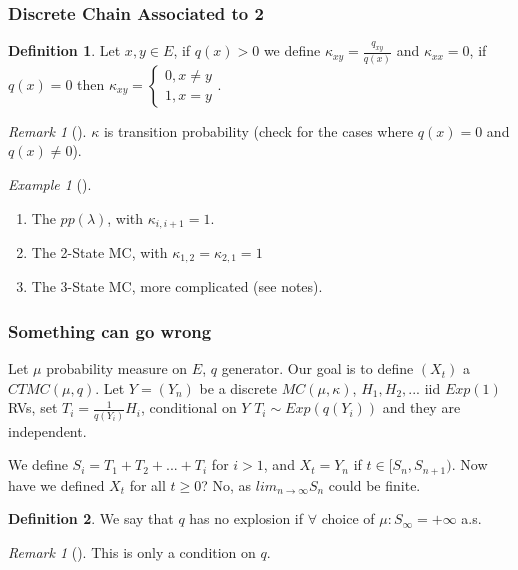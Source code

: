 \documentclass[12pt]{book}
\theoremstyle{definition}
\newtheorem{defn}{Definition}[section]
\theoremstyle{remark}
\newtheorem{ex}{Example}[section]
\newtheorem{rmk}[theorem]{Remark}
\begin{document}
\subsubsection{Discrete Chain Associated to 2}
\begin{defn}
	Let $x,y \in E$, if $q(x)> 0$ we define $\kappa_{xy}= \frac{q_{xy}}{q(x)}$ and $\kappa_{xx}=0$, if $q(x)=0$ then $\kappa_{xy}= 
	\begin{cases}
		0, x \neq y \\
		1, x =y 
	\end{cases}
	$.
\end{defn}

\begin{rmk}[]
	$\kappa $ is transition probability (check for the cases where $q(x) = 0$ and $q(x)\neq 0$). 
\end{rmk}

\begin{ex}[]
\begin{enumerate}
	\item The $pp(\lambda)$, with $\kappa_{i,i+1}=1$.
	\item The 2-State MC, with $\kappa_{1,2}=\kappa_{2,1}=1$ 
	\item The 3-State MC, more complicated (see notes).
\end{enumerate}

\end{ex}

\subsubsection{Something can go wrong}
Let $\mu $ probability measure on $E$, $q$ generator. Our goal is to define $(X_t)$ a $CTMC(\mu, q)$. Let $Y= (Y_n)$ be a discrete $MC(\mu, \kappa)$, $H_1, H_2,...$ iid $Exp(1)$ RVs, set $T_i = \frac{1}{q(Y_i)} H_i$, conditional on $Y$ $T_i \sim Exp(q(Y_i))$ and they are independent.

We define $S_i = T_1 + T_2 + ... + T_i$ for $i>1$, and $X_t = Y_n$ if $t \in [S_n, S_{n+1})$. Now have we defined $X_t$ for all $t\geq 0$? No, as $lim_{n \to \infty }S_n $ could be finite. 

\begin{defn}
	We say that $q$ has no explosion if $\forall $ choice of $\mu: S_{ \infty } = + \infty $ a.s.
\end{defn}

\begin{rmk}[]
	This is only a condition on $q$.
\end{rmk}
\end{document}
